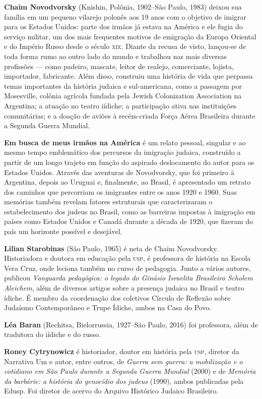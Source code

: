 \textbf{Chaim Novodvorsky} (Knishin, Polônia, 1902--São Paulo, 1983) deixou sua família em um pequeno vilarejo polonês aos 19 anos com o objetivo de imigrar para os Estados Unidos: parte dos irmãos já estava na América e ele fugia do serviço militar, um dos mais frequentes motivos de emigração da Europa Oriental e do Império Russo desde o século \textsc{xix}. Diante da recusa de visto, lançou-se de toda forma rumo ao outro lado do mundo e trabalhou nas mais diversas profissões --- como padeiro, mascate, leitor de realejo, comerciante, lojista, importador, fabricante. Além disso, construiu uma história de vida que perpassa temas importantes da história judaica e sul-americana, como a passagem por Mosesville, colônia agrícola fundada pela Jewish Colonization Association na Argentina; a atuação no teatro iídiche; a participação ativa nas instituições comunitárias; e a doação de aviões à recém-criada Força Aérea Brasileira durante a Segunda Guerra Mundial.

\textbf{Em busca de meus irmãos na América} é um relato pessoal, singular e ao mesmo tempo emblemático dos percursos da imigração judaica, construído a partir de um longo trajeto em função do aspirado deslocamento do autor para os Estados Unidos. Através das aventuras de Novodvorsky, que foi primeiro à Argentina, depois ao Uruguai e, finalmente, ao Brasil, é apresentado um retrato dos caminhos que percorriam os imigrantes entre os anos 1920 e 1960. Suas memórias também revelam fatores estruturais que caracterizaram o estabelecimento dos judeus no Brasil, como as barreiras impostas à imigração em países como Estados Unidos e Canadá durante a década de 1920, que fizeram do país um horizonte possível e desejável.

\pagebreak

\textbf{Lilian Starobinas} (São Paulo, 1965) é neta de Chaim Novodvorsky. Historiadora e doutora em educação pela \textsc{usp}, é professora de história na Escola Vera Cruz, onde leciona também no curso de pedagogia. Junto a vários autores, publicou \textit{Vanguarda pedagógica: o legado do Ginásio Israelita Brasileiro Scholem Aleichem}, além de diversos artigos sobre a presença judaica no Brasil e teatro ídiche. É membro da coordenação dos coletivos Círculo de Reflexão sobre Judaísmo Contemporâneo e Trupe Ídiche, ambos na Casa do Povo. 

\textbf{Léa Baran} (Rechitsa, Bielorrussia, 1927--São Paulo, 2016) foi professora, além de tradutora do iídiche e do russo.

\textbf{Roney Cytrynowicz} é historiador, doutor em história pela \textsc{usp}, diretor da Narrativa Um e autor, entre outros, de \textit{Guerra sem guerra: a mobilização e o cotidiano em São Paulo durante a Segunda Guerra Mundial} (2000) e de \textit{Memória da barbárie: a história do genocídio dos judeus} (1990), ambos publicadas pela Edusp. Foi diretor de acervo do Arquivo Histórico Judaico Brasileiro.




